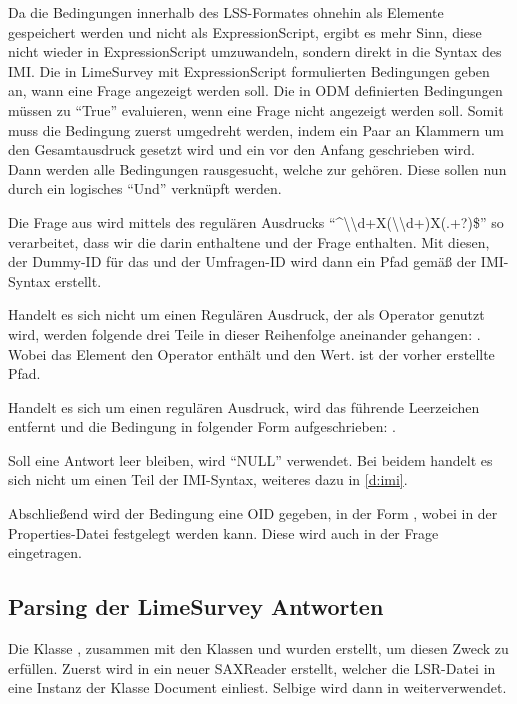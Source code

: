 Da die Bedingungen innerhalb des LSS-Formates ohnehin als Elemente gespeichert werden und nicht als ExpressionScript, ergibt es mehr Sinn, diese nicht wieder in ExpressionScript umzuwandeln, sondern direkt in die Syntax des IMI.
Die in LimeSurvey mit ExpressionScript formulierten Bedingungen geben an, wann eine Frage angezeigt werden soll.
Die in ODM definierten Bedingungen müssen zu \enquote{True} evaluieren, wenn eine Frage nicht angezeigt werden soll.
Somit muss die Bedingung zuerst umgedreht werden, indem ein Paar an Klammern um den Gesamtausdruck gesetzt wird und ein  vor den Anfang geschrieben wird.
Dann werden alle Bedingungen rausgesucht, welche zur  gehören.
Diese sollen nun durch ein logisches \enquote{Und} verknüpft werden.

Die Frage aus  wird mittels des regulären Ausdrucks \enquote{\textasciicircum\textbackslash\textbackslash d+X(\textbackslash\textbackslash d+)X(.+?)\$} so verarbeitet, dass wir die darin enthaltene  und  der Frage enthalten.
Mit diesen, der Dummy-ID für das  und der Umfragen-ID wird dann ein Pfad gemäß der IMI-Syntax erstellt.

Handelt es sich nicht um einen Regulären Ausdruck, der als Operator genutzt wird, werden folgende drei Teile in dieser Reihenfolge aneinander gehangen: .
Wobei das Element  den Operator enthält und  den Wert.  ist der vorher erstellte Pfad.

Handelt es sich um einen regulären Ausdruck, wird das führende Leerzeichen entfernt und die Bedingung in folgender Form aufgeschrieben: .

Soll eine Antwort leer bleiben, wird \enquote{NULL} verwendet.
Bei beidem handelt es sich nicht um einen Teil der IMI-Syntax, weiteres dazu in \cref{d:imi}.

Abschließend wird der Bedingung eine OID gegeben, in der Form , wobei  in der Properties-Datei festgelegt werden kann.
Diese wird auch in der Frage eingetragen.

\subsection{Parsing der LimeSurvey Antworten}
\label{im:ans}

Die Klasse , zusammen mit den Klassen  und  wurden erstellt, um diesen Zweck zu erfüllen.
Zuerst wird in  ein neuer SAXReader erstellt, welcher die LSR-Datei in eine Instanz der Klasse Document einliest.
Selbige wird dann in  weiterverwendet.

